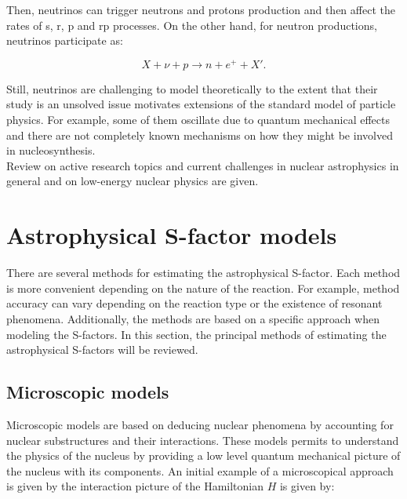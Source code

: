 \documentclass[openany]{book}
\begin{document}
Then, neutrinos can trigger neutrons and protons production and then affect the rates of s, r, p and rp processes. On the other hand, for neutron productions, neutrinos participate as: 

\begin{equation}\label{eq:reaction_neutrino_2}
	X + \nu + p \rightarrow n + e^{+} +  X'.
\end{equation}

Still, neutrinos are challenging to model theoretically to the extent that their study is an unsolved issue motivates extensions of the standard model of particle physics. For example, some of them oscillate due to quantum mechanical effects and there are not completely known mechanisms on how they might be involved in nucleosynthesis. \\

Review on active research topics and current challenges in nuclear astrophysics in general \cite{arcones_bardayan_beers_bernstein_blackmon_messer_brown_brown_brune_champagne_et_2017} and on low-energy nuclear physics \cite{carlson_carpenter_casten_elster_fallon_gade_gross_hagen_hayes_higinbotham_et_2017} are given.


\chapter{Astrophysical S-factor models} \label{ch:sfactorModels}

There are several methods for estimating the astrophysical S-factor. Each method is more convenient depending on the nature of the reaction. For example, method accuracy can vary depending on  the reaction type or the existence of resonant phenomena. Additionally, the methods are based on a specific approach when modeling the S-factors. In this section, the principal methods of estimating the astrophysical S-factors will be reviewed.

\section{Microscopic models} \label{sec:microscopicalModels}

Microscopic models are based on deducing nuclear phenomena by accounting for nuclear substructures and their interactions. These models permits to understand  the physics of the nucleus by providing a low level quantum mechanical picture of the nucleus with its components. An initial example of a microscopical approach is given by the interaction picture of the Hamiltonian $H$ is given by: 
\end{document}
